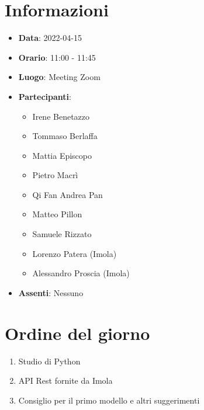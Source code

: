 \section{Informazioni}
	\begin{itemize}
		\item \textbf{Data}: 2022-04-15     %
		\item \textbf{Orario}: 11:00 - 11:45     %
		\item \textbf{Luogo}: Meeting Zoom
		\item \textbf{Partecipanti}:
		\begin{itemize}
			\item Irene Benetazzo
			\item Tommaso Berlaffa
			\item Mattia Episcopo
			\item Pietro Macrì
			\item Qi Fan Andrea Pan
			\item Matteo Pillon
			\item Samuele Rizzato
			\item Lorenzo Patera (Imola)
			\item Alessandro Proscia (Imola)
		\end{itemize}
        \item \textbf{Assenti}: Nessuno
	\end{itemize}
    
	\section{Ordine del giorno}
	\begin{enumerate}
		\item Studio di Python
		\item API Rest fornite da Imola
		\item Consiglio per il primo modello e altri suggerimenti
	\end{enumerate}
	\newpage